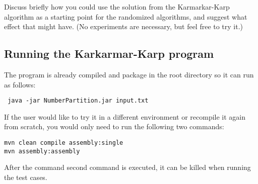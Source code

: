 \documentclass[tikz, 12pt]{scrartcl}
\begin{document}
Discuss briefly how you could use the solution from the Karmarkar-Karp algorithm as a starting point for the randomized algorithms, and suggest what effect that might have. (No experiments are necessary, but feel free to try it.)

\subsection{Running the Karkarmar-Karp program}
The program is already compiled and package in the root directory so it can run as follows:

\begin{verbatim}
 java -jar NumberPartition.jar input.txt 
\end{verbatim}

If the user would like to try it in a different environment or recompile it again from scratch, you would only need to run the following two commands:

\begin{verbatim}
mvn clean compile assembly:single
mvn assembly:assembly
\end{verbatim}

After the command second command is executed, it can be killed when running the test cases.
\end{document}
